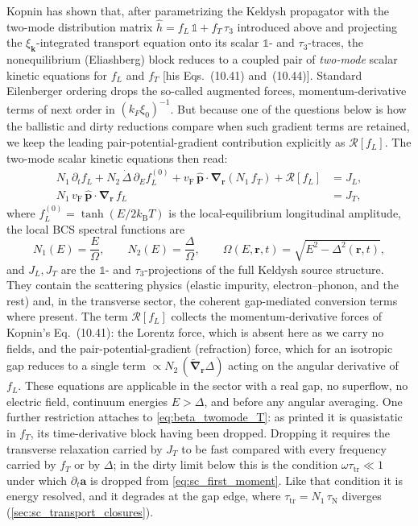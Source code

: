 \documentclass[
  aps,
  prb,
  preprint,
  superscriptaddress,
  longbibliography,
  nofootinbib
]{revtex4-2}
\newcommand{\br}{\mathbf{r}}
\newcommand{\bk}{\mathbf{k}}
\newcommand{\bp}{\mathbf{p}}
\newcommand{\bnabla}{\boldsymbol{\nabla}}
\newcommand{\vF}{v_{\mathrm{F}}}
\newcommand{\tautr}{\tau_{\mathrm{tr}}}
\newcommand{\DOS}{N_1}
\newcommand{\fL}{f_L}
\newcommand{\fT}{f_T}
\providecommand{\openone}{}\renewcommand{\openone}{\mathds{1}}
\begin{document}
Kopnin has shown \cite[\S10.2]{kopnin2001} that, after parametrizing
the Keldysh propagator with the two-mode distribution matrix
\(\hat h=\fL\,\openone+\fT\,\tau_3\) introduced above and projecting the
\(\xi_{\bk}\)-integrated transport equation onto its scalar
\(\openone\)- and \(\tau_3\)-traces, the nonequilibrium (Eliashberg) block
reduces to a coupled pair of \emph{two-mode} scalar kinetic equations
for \(\fL\) and \(\fT\) [his Eqs.~(10.41) and~(10.44)]. Standard
Eilenberger ordering drops the so-called augmented forces,
momentum-derivative terms of next order in \((k_F\xi_0)^{-1}\). But because one of the questions below is how the
ballistic and dirty reductions compare when such gradient terms are
retained, we keep the leading pair-potential-gradient contribution
explicitly as \(\mathcal{R}[\fL]\). The two-mode scalar kinetic equations then read:
\begin{align}
  \DOS\,\partial_t\fL
  + N_2\,\dot\Delta\,\partial_E\fL^{(0)}
  + \vF\,\hat{\bp}\cdot\bnabla_{\br}\!\left(\DOS\,\fT\right)
  + \mathcal{R}[\fL]
  &= J_L,
  \label{eq:beta_twomode_L}\\
  \DOS\,\vF\,\hat{\bp}\cdot\bnabla_{\br}\,\fL
  &= J_T,
  \label{eq:beta_twomode_T}
\end{align}
where \(\fL^{(0)}=\tanh(E/2k_{\mathrm B}T)\) is the local-equilibrium
longitudinal amplitude, the local BCS spectral functions are
\begin{equation}
  \DOS(E)=\frac{E}{\Omega},\qquad
  N_2(E)=\frac{\Delta}{\Omega},\qquad
  \Omega(E,\br,t)=\sqrt{E^{2}-\Delta^{2}(\br,t)}, 
  \label{eq:beta_spectral}
\end{equation}
and \(J_L,J_T\) are the \(\openone\)- and
\(\tau_3\)-projections of the full Keldysh source structure. They
contain the scattering physics (elastic impurity, electron--phonon,
and the rest) and, in the transverse sector, the coherent gap-mediated
conversion terms where present. The term
\(\mathcal{R}[\fL]\) collects the momentum-derivative forces of Kopnin's
Eq.~(10.41): the Lorentz force, which is absent here as we carry no
fields, and the pair-potential-gradient (refraction) force, which for an
isotropic gap reduces to a single term \(\propto
N_2\,(\widetilde{\bnabla}_{\br}\Delta)\) acting on the
angular derivative of \(\fL\). These equations are applicable in the sector with a real gap, no superflow, no electric field, continuum energies
\(E>\Delta\), and before any angular averaging. One further restriction attaches to
\cref{eq:beta_twomode_T}: as printed it is quasistatic in \(\fT\), its
time-derivative block having been dropped. Dropping it requires the
transverse relaxation carried by \(J_T\) to be fast compared with every
frequency carried by \(\fT\) or by \(\Delta\); in the dirty limit below
this is the condition \(\omega\tautr\ll1\) under which
\(\partial_t\mathbf{a}\) is dropped from \cref{eq:sc_first_moment}. Like
that condition it is energy resolved, and it degrades at the gap edge,
where \(\tautr=\DOS\,\tau_{\mathrm N}\) diverges
(\cref{sec:sc_transport_closures}).
\end{document}

